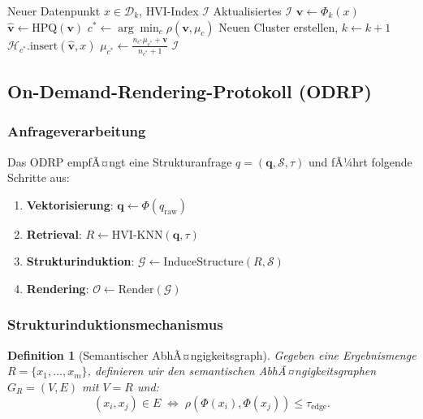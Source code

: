 ﻿\documentclass[12pt,a4paper]{article}
\newtheorem{definition}[theorem]{Definition}
\begin{document}
\begin{algorithm}[ht]
\small
\caption{HVI-Inkrementell-EinfÃ¼gung}
\label{alg:insert}
\begin{algorithmic}[1]
\Require Neuer Datenpunkt $x \in \mathcal{D}_k$, HVI-Index $\mathcal{I}$
\Ensure Aktualisiertes $\mathcal{I}$
\State $\mathbf{v} \gets \Phi_k(x)$ 
\State $\hat{\mathbf{v}} \gets \text{HPQ}(\mathbf{v})$ 
\State $c^* \gets \arg\min_c \rho(\mathbf{v}, \mu_c)$ 
  \State Neuen Cluster erstellen, $k \gets k+1$
\Else
  \State $\mathcal{H}_{c^*}.\text{insert}(\hat{\mathbf{v}}, x)$
  \State $\mu_{c^*} \gets \frac{n_{c^*}\mu_{c^*} + \mathbf{v}}{n_{c^*}+1}$
\EndIf
\State \Return $\mathcal{I}$
\end{algorithmic}
\end{algorithm}

\subsection{On-Demand-Rendering-Protokoll (ODRP)}
\label{sec:odrp}

\subsubsection{Anfrageverarbeitung}

Das ODRP empfÃ¤ngt eine Strukturanfrage $q = (\mathbf{q}, \mathcal{S}, \tau)$ 
und fÃ¼hrt folgende Schritte aus:

\begin{enumerate}[leftmargin=1.2em, itemsep=2pt, topsep=2pt]
  \item \textbf{Vektorisierung}: $\mathbf{q} \gets \Phi(q_{\text{raw}})$
  \item \textbf{Retrieval}: $R \gets \text{HVI-KNN}(\mathbf{q}, \tau)$
  \item \textbf{Strukturinduktion}: $\mathcal{G} \gets \text{InduceStructure}(R, \mathcal{S})$
  \item \textbf{Rendering}: $\mathcal{O} \gets \text{Render}(\mathcal{G})$
\end{enumerate}

\subsubsection{Strukturinduktionsmechanismus}

\begin{definition}[Semantischer AbhÃ¤ngigkeitsgraph]
\label{def:depgraph}
Gegeben eine Ergebnismenge $R = \{x_1, \ldots, x_m\}$, definieren 
wir den semantischen AbhÃ¤ngigkeitsgraphen 
$G_R = (V, E)$ mit $V = R$ und:
\[
  (x_i, x_j) \in E \;\Longleftrightarrow\;
  \rho(\Phi(x_i), \Phi(x_j)) \leq \tau_{\text{edge}}.
\]
\end{definition}
\end{document}
